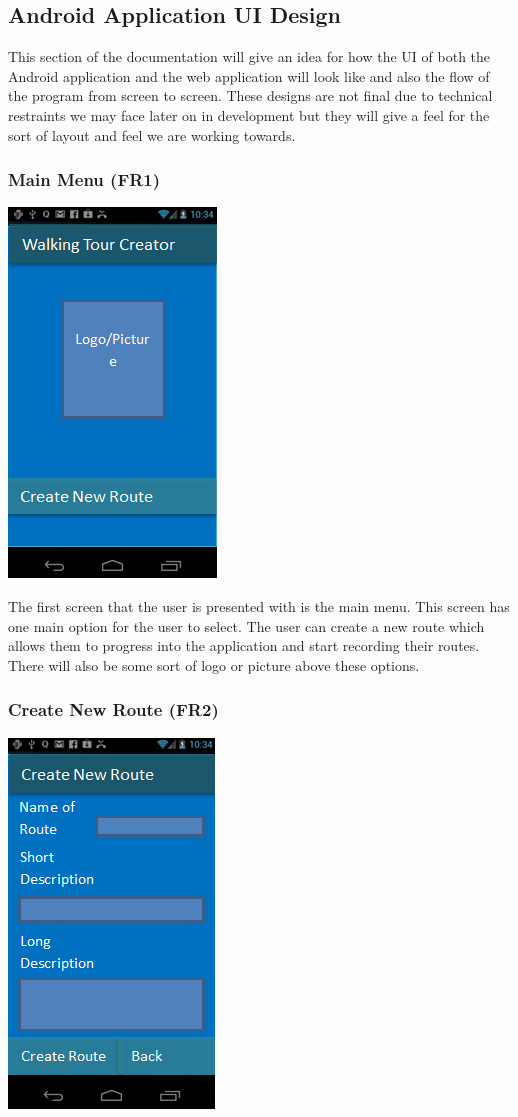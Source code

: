 \documentclass{project}
\begin{document}
\subsection{Android Application UI Design}
This section of the documentation will give an idea for how the UI of both the Android application and the web application
will look like and also the flow of the program from screen to screen. These designs are not final due to technical
restraints we may face later on in development but they will give a feel for the sort of layout and feel we are working towards.

\subsubsection{Main Menu (FR1)}
\bigskip
\includegraphics{PhoneUI1}
\bigskip

The first screen that the user is presented with is the main menu. This screen has one main option for the user to select.
The user can create a new route which allows them to progress into the application and start recording their routes.
There will also be some sort of logo or picture above these options.

\subsubsection{Create New Route (FR2)}
\bigskip
\includegraphics{PhoneUI2}
\bigskip
\end{document}
